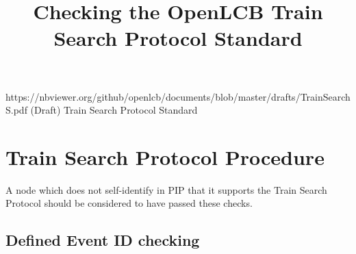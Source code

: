 

\title{Checking the OpenLCB Train Search Protocol Standard}


\maketitle


\introductionCaveats
    {https://nbviewer.org/github/openlcb/documents/blob/master/drafts/TrainSearchS.pdf}
    {(Draft) Train Search Protocol Standard}

\section{Train Search Protocol Procedure}


A node which does not self-identify in PIP that it supports
the Train Search Protocol should be considered to have passed these checks.
\pipsetFootnote

\subsection{Defined Event ID checking}


  
